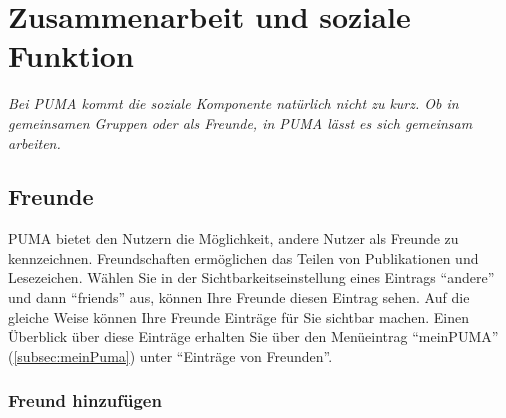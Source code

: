 \chapter{Zusammenarbeit und soziale Funktion}
\label{ch:zusammenarbeit}
\textit{Bei PUMA kommt die soziale Komponente natürlich nicht zu kurz. Ob in gemeinsamen Gruppen oder als Freunde, in PUMA lässt es sich gemeinsam arbeiten.}
\section{Freunde}%
\label{sec:freunde}
PUMA bietet den Nutzern die Möglichkeit, andere Nutzer als Freunde zu kennzeichnen.  Freundschaften ermöglichen das Teilen von Publikationen und Lesezeichen. Wählen Sie in der Sichtbarkeitseinstellung eines Eintrags \enquote{andere} und dann \enquote{friends} aus, können Ihre Freunde diesen Eintrag sehen. Auf die gleiche Weise können Ihre Freunde Einträge für Sie sichtbar machen. Einen Überblick über diese Einträge erhalten Sie über den Menüeintrag \enquote{meinPUMA} (\autoref{subsec:meinPuma}) unter \enquote{Einträge von Freunden}.\newline

\subsection{Freund hinzufügen}
\label{subsec:freundHinzu}

